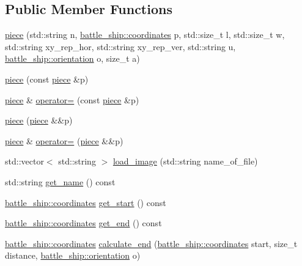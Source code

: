 \subsection*{Public Member Functions}
\begin{DoxyCompactItemize}
\item 
\hyperlink{classbattle__ship_1_1piece_a3c2ee9204e8dbe719fb79753f84aae63}{piece} (std\+::string n, \hyperlink{structbattle__ship_1_1coordinates}{battle\+\_\+ship\+::coordinates} p, std\+::size\+\_\+t l, std\+::size\+\_\+t w, std\+::string xy\+\_\+rep\+\_\+hor, std\+::string xy\+\_\+rep\+\_\+ver, std\+::string u, \hyperlink{namespacebattle__ship_aed87488f0a73f0d0679fe343fb61c784}{battle\+\_\+ship\+::orientation} o, size\+\_\+t a)
\item 
\hyperlink{classbattle__ship_1_1piece_a72388913e2fe9107c6f2706adfb6054d}{piece} (const \hyperlink{classbattle__ship_1_1piece}{piece} \&p)
\item 
\hyperlink{classbattle__ship_1_1piece}{piece} \& \hyperlink{classbattle__ship_1_1piece_a1147437e97aef00c52f9255a47e87732}{operator=} (const \hyperlink{classbattle__ship_1_1piece}{piece} \&p)
\item 
\hyperlink{classbattle__ship_1_1piece_a4c677afb8c0d0940da627b5a871c99a8}{piece} (\hyperlink{classbattle__ship_1_1piece}{piece} \&\&p)
\item 
\hyperlink{classbattle__ship_1_1piece}{piece} \& \hyperlink{classbattle__ship_1_1piece_a683a77d137a80eb7b4780c83bfe92b9a}{operator=} (\hyperlink{classbattle__ship_1_1piece}{piece} \&\&p)
\item 
std\+::vector$<$ std\+::string $>$ \hyperlink{classbattle__ship_1_1piece_a32b199cb8c7c77cf2caadeabea5dd362}{load\+\_\+image} (std\+::string name\+\_\+of\+\_\+file)
\item 
std\+::string \hyperlink{classbattle__ship_1_1piece_acb14495f784dfb6dd382c107e592908c}{get\+\_\+name} () const
\item 
\hyperlink{structbattle__ship_1_1coordinates}{battle\+\_\+ship\+::coordinates} \hyperlink{classbattle__ship_1_1piece_a45f97829a407e4d9fc7f21c606410f12}{get\+\_\+start} () const
\item 
\hyperlink{structbattle__ship_1_1coordinates}{battle\+\_\+ship\+::coordinates} \hyperlink{classbattle__ship_1_1piece_ae543ba6479d93d243f27afb3a75b9e0a}{get\+\_\+end} () const
\item 
\hyperlink{structbattle__ship_1_1coordinates}{battle\+\_\+ship\+::coordinates} \hyperlink{classbattle__ship_1_1piece_a1c289ed471cf7adb9d2f0748bb05f84f}{calculate\+\_\+end} (\hyperlink{structbattle__ship_1_1coordinates}{battle\+\_\+ship\+::coordinates} start, size\+\_\+t distance, \hyperlink{namespacebattle__ship_aed87488f0a73f0d0679fe343fb61c784}{battle\+\_\+ship\+::orientation} o)

\end{DoxyCompactItemize}
